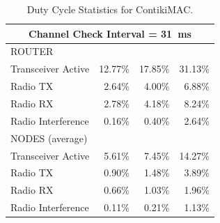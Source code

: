 \documentclass[conference]{IEEEtran}
\begin{document}
\begin{table}[tbph]
\begin{tabular}{|l|r|r|r|}
\multicolumn{4}{|c|}{Channel Check Interval = 31~ms}\\
\hline
 ROUTER & \multicolumn{3}{|c|}{ }\\
\hline
Transceiver Active & 12.77\% & 17.85\% & 31.13\% \\
Radio TX           &  2.64\% &  4.00\% &  6.88\% \\
Radio RX           &  2.78\% &  4.18\% &  8.24\% \\
Radio Interference &  0.16\% &  0.40\% &  2.64\% \\
\hline
 NODES (average) & \multicolumn{3}{|c|}{ }\\
\hline
Transceiver Active & 5.61\% & 7.45\% & 14.27\% \\
Radio TX           & 0.90\% & 1.48\% &  3.89\% \\
Radio RX           & 0.66\% & 1.03\% &  1.96\% \\
Radio Interference & 0.11\% & 0.21\% &  1.13\% \\

\hline
\end{tabular}
\caption{Duty Cycle Statistics for ContikiMAC.}
\label{TblDutyCyclesContikiMAC}
\end{table}
\end{document}
